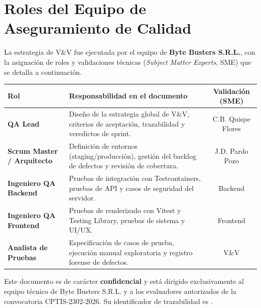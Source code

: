 \vspace{0.6cm}

\section*{Roles del Equipo de Aseguramiento de Calidad}
La estrategia de V\&V fue ejecutada por el equipo de \textbf{Byte Busters S.R.L.}, con la
asignación de roles y validaciones técnicas (\textit{Subject Matter Experts}, SME) que se
detalla a continuación.

\clearpage
\vspace{0.2cm}
\noindent
\renewcommand{\arraystretch}{1.4}
\fontsize{9}{10.8}\selectfont\sffamily
\begin{tabularx}{\textwidth}{|>{\bfseries\color{colorPrimario}}l|X|c|}
\hline
\rowcolor{headerTabla}
\textbf{Rol} & \textbf{Responsabilidad en el documento} & \textbf{Validación (SME)} \\
\hline
QA Lead & Diseño de la estrategia global de V\&V, criterios de aceptación, trazabilidad y veredictos de sprint. & C.B. Quispe Flores \\
\hline
\rowcolor{grisTecnico}
Scrum Master / Arquitecto & Definición de entornos (staging/producción), gestión del backlog de defectos y revisión de cobertura. & J.D. Pardo Pozo \\
\hline
Ingeniero QA Backend & Pruebas de integración con Testcontainers, pruebas de API y casos de seguridad del servidor. & Backend \\
\hline
\rowcolor{grisTecnico}
Ingeniero QA Frontend & Pruebas de renderizado con Vitest y Testing Library, pruebas de sistema y UI/UX. & Frontend \\
\hline
Analista de Pruebas & Especificación de casos de prueba, ejecución manual exploratoria y registro forense de defectos. & V\&V \\
\hline
\end{tabularx}

\vspace{0.4cm}
\begin{NotaTecnica}
Este documento es de carácter \textbf{confidencial} y está dirigido exclusivamente al
equipo técnico de Byte Busters S.R.L. y a los evaluadores autorizados de la convocatoria
CPTIS-2302-2026. Su identificador de trazabilidad es .
\end{NotaTecnica}
\clearpage
